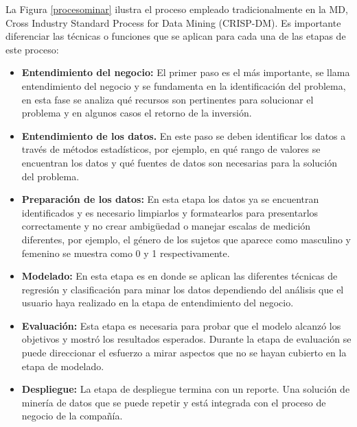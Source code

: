 La Figura \ref{procesominar}  ilustra el proceso empleado tradicionalmente en la MD, Cross Industry Standard Process for Data Mining  (CRISP-DM)\cite{Hornick2009}. Es importante diferenciar las técnicas o funciones que se aplican para cada una de las etapas de este proceso:
\begin{itemize}

\item{ \textbf{Entendimiento del negocio:}}
 El primer paso es el más importante, se llama entendimiento del negocio y se fundamenta en la identificación del problema, en esta fase se analiza qué recursos son pertinentes para solucionar el problema y en algunos casos el retorno de la inversión\cite{Hornick2009}.
\item{ \textbf{Entendimiento de los datos.}}
En este paso se deben identificar los datos a través de métodos estadísticos, por ejemplo, en qué rango de valores se encuentran los datos y qué fuentes de datos son necesarias para la solución del problema\cite{Hornick2009}.
\item{ \textbf{Preparación de los datos:}}
En esta etapa los datos ya se encuentran identificados y es necesario limpiarlos y formatearlos para presentarlos correctamente y no crear ambigüedad o manejar escalas de medición diferentes, por ejemplo, el género de los sujetos que aparece como masculino y femenino se muestra como 0 y 1 respectivamente\cite{Hornick2009}.
\item{ \textbf{Modelado:}}
En esta etapa es en donde se aplican las diferentes técnicas de regresión y clasificación para minar los datos dependiendo del análisis que el usuario haya realizado en la etapa de entendimiento del negocio\cite{Hornick2009}.
\item{ \textbf{Evaluación:}}
Esta etapa es necesaria para probar que el modelo alcanzó los objetivos y mostró los resultados esperados. Durante la etapa de evaluación se puede direccionar el esfuerzo a mirar aspectos que no se hayan cubierto en la etapa de modelado\cite{Hornick2009}.
\item{ \textbf{Despliegue:}}
La etapa de despliegue termina con un reporte. Una solución de minería de datos que se puede repetir y está integrada con el proceso de negocio de la compañía\cite{Hornick2009}.

\end{itemize}


